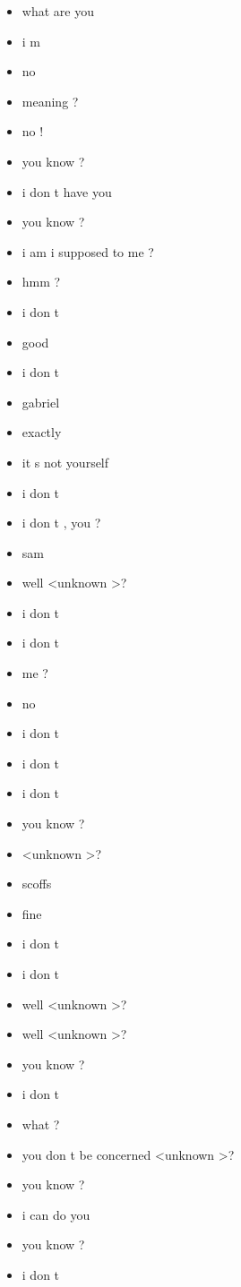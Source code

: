 \begin{multicols}{4}
\begin{itemize}[noitemsep]
		\item what are you
		\item i m
		\item no
		\item meaning ?
		\item no !
		\item you know ?
		\item i don t have you
		\item you know ?
		\item i am i supposed to me ?
		\item hmm ?
		\item i don t
		\item good
		\item i don t
		\item gabriel
		\item exactly
		\item it s not yourself
		\item i don t
		\item i don t , you ?
		\item sam
		\item well \textless unknown \textgreater ?
		\item i don t
		\item i don t
		\item me ?
		\item no
		\item i don t
		\item i don t
		\item i don t
		\item you know ?
		\item \textless unknown \textgreater ?
		\item scoffs
		\item fine
		\item i don t
		\item i don t
		\item well \textless unknown \textgreater ?
		\item well \textless unknown \textgreater ?
		\item you know ?
		\item i don t
		\item what ?
		\item you don t be concerned \textless unknown \textgreater ?
		\item you know ?
		\item i can do you
		\item you know ?
		\item i don t

\end{itemize}
\end{multicols}
